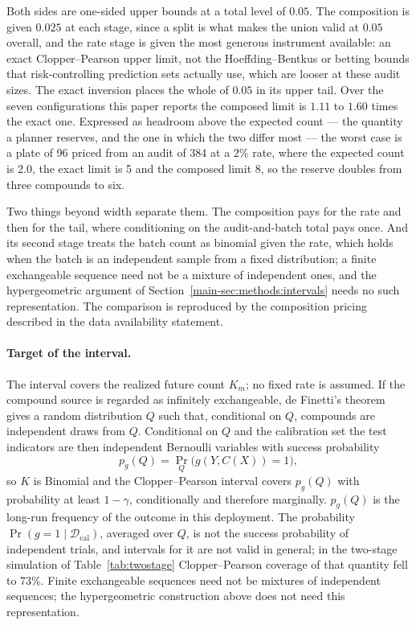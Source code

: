 \documentclass[10pt]{article}
\newcommand{\Dcal}{\mathcal D_{\mathrm{cal}}}
\begin{document}
Both sides are one-sided upper bounds at a total level of $0.05$. The composition is given
$0.025$ at each stage, since a split is what makes the union valid at $0.05$ overall, and the
rate stage is given the most generous instrument available: an exact Clopper--Pearson upper
limit, not the Hoeffding--Bentkus or betting bounds that risk-controlling prediction sets
actually use, which are looser at these audit sizes. The exact inversion places the whole of
$0.05$ in its upper tail. Over the seven configurations this paper reports the composed limit
is $1.11$ to $1.60$ times the exact one. Expressed as headroom above the expected count --- the
quantity a planner reserves, and the one in which the two differ most --- the worst case is a
plate of 96 priced from an audit of 384 at a $2\%$ rate, where the expected count is 2.0, the
exact limit is 5 and the composed limit 8, so the reserve doubles from three compounds to six.

Two things beyond width separate them. The composition pays for the rate and then for the tail,
where conditioning on the audit-and-batch total pays once. And its second stage treats the
batch count as binomial given the rate, which holds when the batch is an independent sample
from a fixed distribution; a finite exchangeable sequence need not be a mixture of independent
ones,\citep{DiaconisFreedman1980} and the hypergeometric argument of
Section~\ref{main-sec:methods:intervals} needs no such representation. The comparison is reproduced
by the composition pricing described in the data availability statement.

\label{sec:target}
\paragraph{Target of the interval.} The interval covers the realized future count $K_m$; no fixed rate is assumed. If the compound source is regarded as infinitely exchangeable, de Finetti's theorem\citep{Aldous1985} gives a random distribution $Q$ such that, conditional on $Q$, compounds are independent draws from $Q$. Conditional on $Q$ and the calibration set the test indicators are then independent Bernoulli variables with success probability
\begin{equation}
p_g(Q)=\Pr_Q\big(g(Y,C(X))=1\big),
\end{equation}
so $K$ is Binomial and the Clopper--Pearson interval covers $p_g(Q)$ with probability at least $1-\gamma$, conditionally and therefore marginally. $p_g(Q)$ is the long-run frequency of the outcome in this deployment. The probability $\Pr(g=1\mid\Dcal)$, averaged over $Q$, is not the success probability of independent trials, and intervals for it are not valid in general; in the two-stage simulation of Table~\ref{tab:twostage} Clopper--Pearson coverage of that quantity fell to 73\%. Finite exchangeable sequences need not be mixtures of independent sequences;\citep{DiaconisFreedman1980} the hypergeometric construction above does not need this representation.
\end{document}
